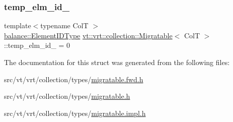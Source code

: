 \mbox{\label{structvt_1_1vrt_1_1collection_1_1_migratable_a0a6e381b0220dbb905a755e8262c8695}} 
\subsubsection{\texorpdfstring{temp\+\_\+elm\+\_\+id\+\_\+}{temp\_elm\_id\_}}
{\footnotesize\ttfamily template$<$typename ColT $>$ \\
\hyperlink{namespacevt_1_1vrt_1_1collection_1_1balance_a14c8d2c972f2913aa3f1636e5be0a120}{balance\+::\+Element\+I\+D\+Type} \hyperlink{structvt_1_1vrt_1_1collection_1_1_migratable}{vt\+::vrt\+::collection\+::\+Migratable}$<$ ColT $>$\+::temp\+\_\+elm\+\_\+id\+\_\+ = 0\hspace{0.3cm}{\ttfamily [protected]}}



The documentation for this struct was generated from the following files\+:\begin{DoxyCompactItemize}
\item 
src/vt/vrt/collection/types/\hyperlink{migratable_8fwd_8h}{migratable.\+fwd.\+h}\item 
src/vt/vrt/collection/types/\hyperlink{migratable_8h}{migratable.\+h}\item 
src/vt/vrt/collection/types/\hyperlink{migratable_8impl_8h}{migratable.\+impl.\+h}\end{DoxyCompactItemize}
